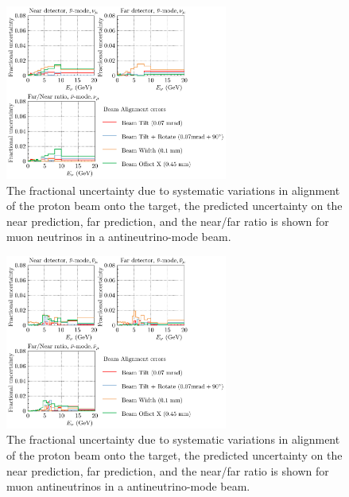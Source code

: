 \documentclass{article}
\begin{document}
\begin{figure}
  \centering
  \includegraphics[width=0.65\textwidth]{plots/fracerrs/nubarmode_numu_BeamAlignment}
  \caption{The fractional uncertainty due to systematic variations in alignment of the proton beam onto the target, the predicted uncertainty on the near prediction, far prediction, and the near/far ratio is shown for muon neutrinos in a antineutrino-mode beam.}
  \label{fig:beamalign_nubar_numu}
\end{figure}

\begin{figure}
  \centering
  \includegraphics[width=0.65\textwidth]{plots/fracerrs/nubarmode_numubar_BeamAlignment}
  \caption{The fractional uncertainty due to systematic variations in alignment of the proton beam onto the target, the predicted uncertainty on the near prediction, far prediction, and the near/far ratio is shown for muon antineutrinos in a antineutrino-mode beam.}
  \label{fig:beamalign_nubar_numubar}
\end{figure}
\end{document}
